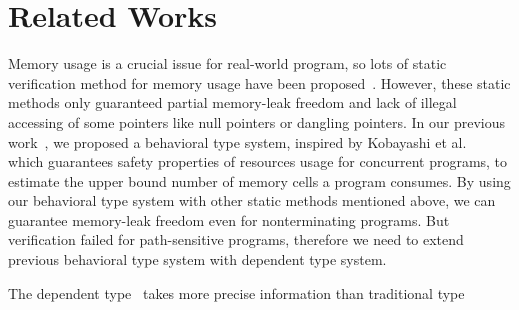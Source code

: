 \section{Related Works}\label{sec:relatedwork}

Memory usage is a crucial issue for real-world program, so lots of
static verification method for memory usage have been
proposed~\cite{DBLP:conf/aplas/SuenagaK09,DBLP:conf/pldi/HeineL03,DBLP:conf/sigsoft/XieA05,DBLP:journals/scp/SwamyHMGJ06,DBLP:conf/sas/OrlovichR06,DBLP:conf/issta/SuiYX12}. However,
these static methods only guaranteed partial memory-leak freedom and
lack of illegal accessing of some pointers like null pointers or
dangling pointers.  In our previous work~\cite{}, we proposed a
behavioral type system, inspired by Kobayashi et
al.~\cite{DBLP:journals/lmcs/KobayashiSW06} which guarantees safety
properties of resources usage for concurrent programs, to estimate the
upper bound number of memory cells a program consumes.  By using our
behavioral type system with other static methods mentioned above, we
can guarantee memory-leak freedom even for nonterminating
programs. But verification failed for path-sensitive programs,
therefore we need to extend previous behavioral type system with
dependent type system.

The dependent
type~\cite{DBLP:conf/popl/XiP99,DBLP:conf/pldi/XiP98,DBLP:conf/tldi/Norell09,}
takes more precise information than traditional type
